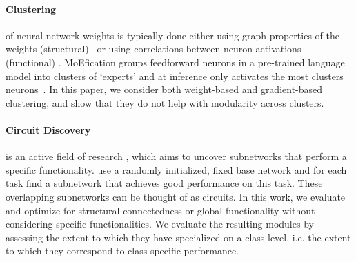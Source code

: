 \paragraph{Clustering} of neural network weights is typically done either using graph properties of the weights (structural)~\citep{watanabe2018modular, filan2021clusterability, patil2023neural} or using correlations between neuron activations (functional) \citep{hod2022detecting, lange2022clustering}.
MoEfication groups feedforward neurons in a pre-trained language model into clusters of `experts' and at inference only activates the most clusters neurons~\citep{zhang2022moefication}. In this paper, we consider both weight-based and gradient-based clustering, and show that they do not help with modularity across clusters.

\paragraph{Circuit Discovery} is an active field of research \citep{wang2022interpretability, olah2020zoom, elhage2021mathematical, conmy2023towards}, which aims to uncover subnetworks that perform a specific functionality. 
\citet{wortsman2020supermasks} use a randomly initialized, fixed base network and for each task find a subnetwork that achieves good performance on this task. 
These overlapping subnetworks can be thought of as circuits.
In this work, we evaluate and optimize for structural connectedness or global functionality without considering specific functionalities.
We evaluate the resulting modules by assessing the extent to which they have specialized on a class level, i.e. the extent to which they correspond to class-specific performance.

